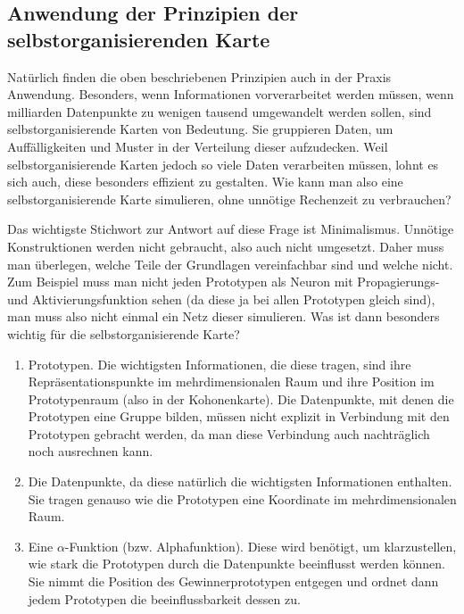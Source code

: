 \documentclass[twoside,a4paper,draft]{article}
\begin{document}
\subsection{Anwendung der Prinzipien der selbstorganisierenden Karte}

Natürlich finden die oben beschriebenen Prinzipien auch in der Praxis Anwendung. Besonders, wenn Informationen vorverarbeitet werden müssen, wenn milliarden Datenpunkte zu wenigen tausend umgewandelt werden sollen, sind selbstorganisierende Karten von Bedeutung. Sie gruppieren Daten, um Auffälligkeiten und Muster in der Verteilung dieser aufzudecken. Weil selbstorganisierende Karten jedoch so viele Daten verarbeiten müssen, lohnt es sich auch, diese besonders effizient zu gestalten. Wie kann man also eine selbstorganisierende Karte simulieren, ohne unnötige Rechenzeit zu verbrauchen?

Das wichtigste Stichwort zur Antwort auf diese Frage ist Minimalismus. Unnötige Konstruktionen werden nicht gebraucht, also auch nicht umgesetzt. Daher muss man überlegen, welche Teile der Grundlagen vereinfachbar sind und welche nicht. Zum Beispiel muss man nicht jeden Prototypen als Neuron mit Propagierungs- und Aktivierungsfunktion sehen (da diese ja bei allen Prototypen gleich sind), man muss also nicht einmal ein Netz dieser simulieren. Was ist dann besonders wichtig für die selbstorganisierende Karte?

\begin{enumerate}
\item Prototypen. Die wichtigsten Informationen, die diese tragen, sind ihre Repräsentationspunkte im mehrdimensionalen Raum und ihre Position im Prototypenraum (also in der Kohonenkarte). Die Datenpunkte, mit denen die Prototypen eine Gruppe bilden, müssen nicht explizit in Verbindung mit den Prototypen gebracht werden, da man diese Verbindung auch nachträglich noch ausrechnen kann.

\item Die Datenpunkte, da diese natürlich die wichtigsten Informationen enthalten. Sie tragen genauso wie die Prototypen eine Koordinate im mehrdimensionalen Raum.

\item Eine \(\alpha\)-Funktion (bzw. Alphafunktion). Diese wird benötigt, um klarzustellen, wie stark die Prototypen durch die Datenpunkte beeinflusst werden können. Sie nimmt die Position des Gewinnerprototypen entgegen und ordnet dann jedem Prototypen die beeinflussbarkeit dessen zu.
\end{enumerate}
\end{document}
